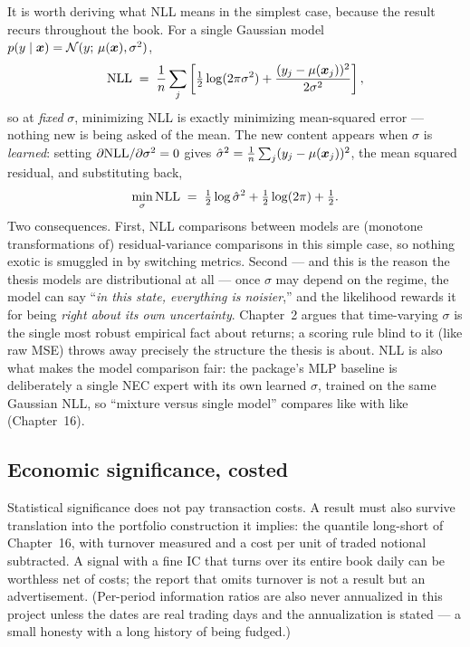 It is worth deriving what NLL means in the simplest case, because the result
recurs throughout the book. For a single Gaussian model
$p(y \mid \bm{x}) = \mathcal{N}(y;\, \mu(\bm{x}), \sigma^2)$,
\[
  \mathrm{NLL} \;=\; \frac1n \sum_j
  \left[ \tfrac12 \log(2\pi\sigma^2)
       + \frac{(y_j - \mu(\bm{x}_j))^2}{2\sigma^2} \right],
\]
so at \emph{fixed} $\sigma$, minimizing NLL is exactly minimizing
mean-squared error --- nothing new is being asked of the mean. The new
content appears when $\sigma$ is \emph{learned}: setting
$\partial \mathrm{NLL} / \partial \sigma^2 = 0$ gives
$\hat\sigma^2 = \frac1n \sum_j (y_j - \mu(\bm{x}_j))^2$, the mean squared
residual, and substituting back,
\[
  \min_{\sigma} \mathrm{NLL} \;=\; \tfrac12 \log \hat\sigma^2 + \tfrac12\log(2\pi) + \tfrac12 .
\]
Two consequences. First, NLL comparisons between models are (monotone
transformations of) residual-variance comparisons in this simple case, so
nothing exotic is smuggled in by switching metrics. Second --- and this is
the reason the thesis models are distributional at all --- once $\sigma$ may
depend on the regime, the model can say ``\emph{in this state, everything is
noisier},'' and the likelihood rewards it for being \emph{right about its own
uncertainty}. Chapter~2 argues that time-varying $\sigma$ is the single most
robust empirical fact about returns; a scoring rule blind to it (like raw
MSE) throws away precisely the structure the thesis is about. NLL is also
what makes the model comparison fair: the package's MLP baseline is
deliberately a single NEC expert with its own learned $\sigma$, trained on
the same Gaussian NLL, so ``mixture versus single model'' compares like with
like (Chapter~16).

\subsection{Economic significance, costed}

Statistical significance does not pay transaction costs. A result must also
survive translation into the portfolio construction it implies: the quantile
long-short of Chapter~16, with turnover measured and a cost per unit of
traded notional subtracted. A signal with a fine IC that turns over its
entire book daily can be worthless net of costs; the report that omits
turnover is not a result but an advertisement. (Per-period information
ratios are also never annualized in this project unless the dates are real
trading days and the annualization is stated --- a small honesty with a long
history of being fudged.)


